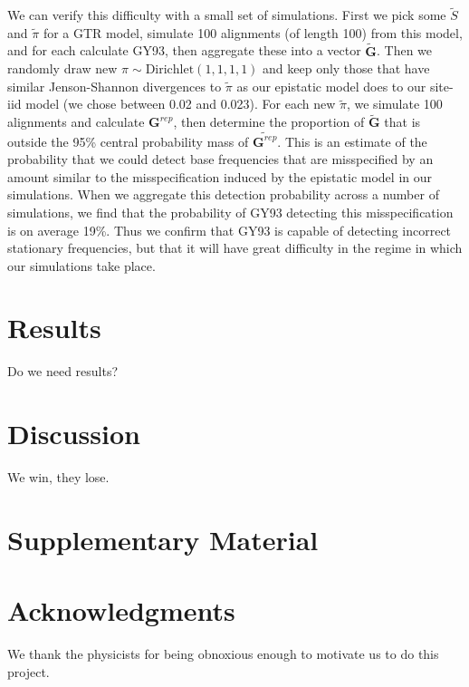\documentclass[11pt]{article}
\begin{document}
We can verify this difficulty with a small set of simulations.
First we pick some $\tilde{S}$ and $\tilde{\pi}$ for a GTR model, simulate 100 alignments (of length 100) from this model, and for each calculate GY93, then aggregate these into a vector $\boldsymbol{\tilde{G}}$.
Then we randomly draw new $\pi \sim \text{Dirichlet}(1,1,1,1)$ and keep only those that have similar Jenson-Shannon divergences to $\tilde{\pi}$ as our epistatic model does to our site-iid model (we chose between 0.02 and 0.023).
For each new $\tilde{\pi}$, we simulate 100 alignments and calculate $\boldsymbol{G}^{rep}$, then determine the proportion of $\boldsymbol{\tilde{G}}$ that is outside the 95\% central probability mass of $\tilde{\boldsymbol{G}^{rep}}$.
This is an estimate of the probability that we could detect base frequencies that are misspecified by an amount similar to the misspecification induced by the epistatic model in our simulations.
When we aggregate this detection probability across a number of simulations, we find that the probability of GY93 detecting this misspecification is on average 19\%.
Thus we confirm that GY93 is capable of detecting incorrect stationary frequencies, but that it will have great difficulty in the regime in which our simulations take place.

\section*{Results\label{sec:results}}

Do we need results?

\section*{Discussion\label{sec:discussion}}

We win, they lose.

\section*{Supplementary Material}



\section*{Acknowledgments}
We thank the physicists for being obnoxious enough to motivate us to do this project.



\end{document}
